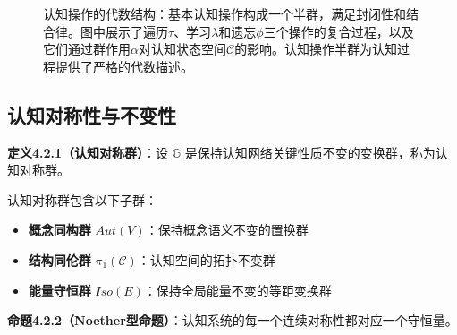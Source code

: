 \documentclass[12pt,a4paper]{article}
\newcommand{\cognitivespace}{\mathcal{C}}
\newcommand{\cognitivegroup}{\mathbb{G}}
\begin{document}
\begin{figure}[H]
\caption{认知操作的代数结构：基本认知操作构成一个半群，满足封闭性和结合律。图中展示了遍历$\tau$、学习$\lambda$和遗忘$\phi$三个操作的复合过程，以及它们通过群作用$\alpha$对认知状态空间$\mathcal{C}$的影响。认知操作半群为认知过程提供了严格的代数描述。}
\label{fig:cognitive_semigroup}
\end{figure}

\subsection{认知对称性与不变性}

\textbf{定义4.2.1（认知对称群）}：设 $\cognitivegroup$ 是保持认知网络关键性质不变的变换群，称为认知对称群。

认知对称群包含以下子群：
\begin{itemize}
\item \textbf{概念同构群} $Aut(V)$：保持概念语义不变的置换群
\item \textbf{结构同伦群} $\pi_1(\cognitivespace)$：认知空间的拓扑不变群
\item \textbf{能量守恒群} $Iso(E)$：保持全局能量不变的等距变换群
\end{itemize}

\textbf{命题4.2.2（Noether型命题）}：认知系统的每一个连续对称性都对应一个守恒量。
\end{document}
